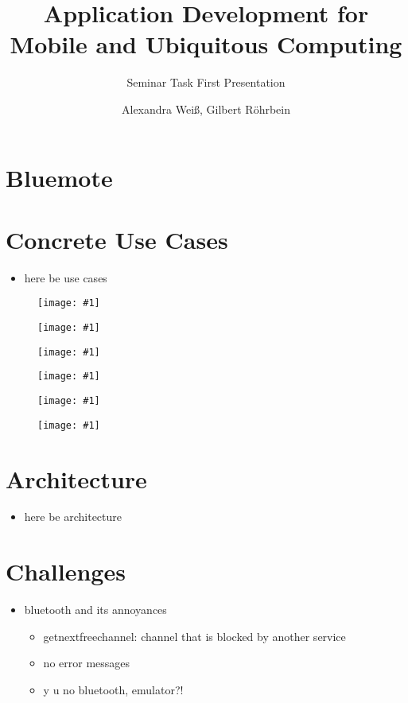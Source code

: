 \documentclass[ddc nogerman]{tudbeamer}
\newcommand{\imageframe}[1]{
    \begin{frame}
        \begin{figure}
            \centering
            \texttt{[image: \#1]}
        \end{figure}
    \end{frame}
}
\begin{document}

\title{Application Development for Mobile and Ubiquitous Computing}
\subtitle{Seminar Task First Presentation}
\author{Alexandra Weiß, Gilbert Röhrbein}

\maketitle

\section{Bluemote}
\begin{frame}
\end{frame}

\section{Concrete Use Cases}
\begin{frame}
    \begin{itemize}
        \item here be use cases

    \end{itemize}
\end{frame}

\imageframe{img/btactivate.png}
\imageframe{img/btauth.png}
\imageframe{img/choosedevice.png}
\imageframe{img/choosefunction.png}
\imageframe{img/presentation.png}
\imageframe{img/vlc.png}

\section{Architecture}
\begin{frame}
    \begin{itemize}
        \item here be architecture
    \end{itemize}
\end{frame}

\section{Challenges}
\begin{frame}
    \begin{itemize}
        \item bluetooth and its annoyances
        \begin{itemize}
        	\item getnextfreechannel: channel that is blocked by another service
        	\item no error messages
            \item y u no bluetooth, emulator?!
        \end{itemize}
    \end{itemize}
\end{frame}
\end{document}
